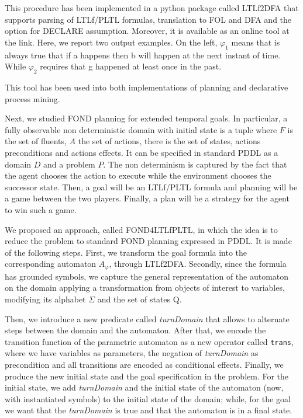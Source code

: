 \documentclass[]{article}
\begin{document}
\bigskip
This procedure has been implemented in a python package called LTLf2DFA that supports parsing of LTLf/PLTL formulas, translation to FOL and DFA and the option for DECLARE assumption. Moreover, it is available as an online tool at the link. Here, we report two output examples. On the left, $\varphi_1$ means that is always true that if a happens then b will happen at the next instant of time. While $\varphi_2$ requires that g happened at least once in the past.

This tool has been used into both implementations of planning and declarative process mining.

\bigskip
Next, we studied FOND planning for extended  temporal goals. In particular, a fully observable non deterministic domain with initial state is a tuple where $F$ is the set of fluents, $A$ the set of actions, there is the set of states, actions preconditions and actions effects. It can be specified in standard PDDL as a domain $D$ and a problem $P$. The non determinism is captured by the fact that the agent chooses the action to execute while the environment chooses the successor state.
Then, a goal will be an LTLf/PLTL formula and planning will be a game between the two players. Finally, a plan will be a strategy for the agent to win such a game.

\bigskip
We proposed an approach, called FOND4LTLfPLTL, in which the idea is to reduce the problem to standard FOND planning expressed in PDDL. It is made of the following steps. First, we transform the goal formula into the corresponding automaton $A_\varphi$, through LTLf2DFA. Secondly, since the formula has grounded symbols, we capture the general representation of the automaton on the domain applying a transformation from objects of interest to variables, modifying its alphabet $\Sigma$ and the set of states Q.

\bigskip
Then, we introduce a new predicate called \textit{turnDomain} that allows to alternate steps between the domain and the automaton. After that, we encode the transition function of the parametric automaton as a new operator called \texttt{trans}, where we have variables as parameters, the negation of \textit{turnDomain} as precondition and all transitions are encoded as conditional effects. Finally, we produce the new initial state and the goal specification in the problem. For the initial state, we add \textit{turnDomain} and the initial state of the automaton (now, with instantiated symbols) to the initial state of the domain; while, for the goal we want that the \textit{turnDomain} is true and that the automaton is in a final state.
\end{document}
